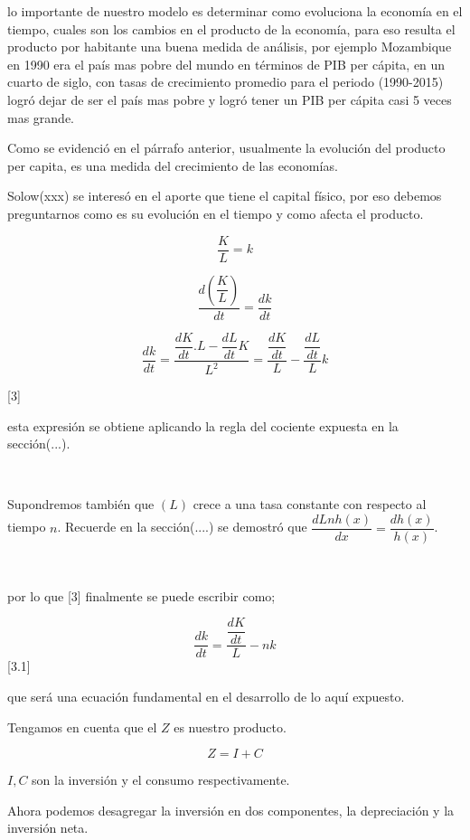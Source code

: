 \documentclass[12pt]{article}
\begin{document}
lo importante de nuestro modelo es determinar como evoluciona la economía en el tiempo, cuales son los cambios en el producto de la economía, para eso resulta el producto por habitante una buena medida de análisis, por ejemplo Mozambique en 1990 era el país mas pobre del mundo en términos de PIB per cápita, en un cuarto de siglo, con tasas de crecimiento promedio para el periodo (1990-2015) logró dejar de ser el país mas pobre y logró tener un PIB per cápita casi 5 veces mas grande.





Como se evidenció en el párrafo anterior, usualmente la evolución del producto per capita, es una medida del crecimiento de las economías.

Solow(xxx) se interesó en el aporte que tiene el capital físico, por eso debemos preguntarnos como es su evolución en el tiempo y como afecta el producto.



$$\dfrac{K}{L} =k $$

$$ \dfrac{d(\dfrac{K}{L})}{dt}= \dfrac {dk}{dt}$$


$$ \dfrac{dk}{dt}=\dfrac{\dfrac{dK}{dt}.L-\dfrac{dL}{dt}K}{L^{2}} = \dfrac{\dfrac{dK}{dt}}{L}-\dfrac{\dfrac{dL}{dt}}{L}k$$

[3]

esta expresión se obtiene aplicando la regla del cociente expuesta en la sección(...).





\

Supondremos también que $(L)$ crece a una tasa constante con respecto al tiempo $n$.  Recuerde en la sección(....) se demostró que $\dfrac{d Ln h(x)}{dx}=\dfrac{dh(x)}{h(x)}$.

\

por lo que [3] finalmente se puede escribir como; 

$$\dfrac{dk}{dt}=\dfrac{\dfrac{dK}{dt}}{L}-nk$$ [3.1] 

que será una ecuación fundamental en el desarrollo de lo aquí expuesto.






Tengamos en cuenta que el $Z$ es nuestro producto.

$$Z=I+C$$

$I,C$ son la inversión y el consumo respectivamente.

Ahora podemos desagregar la inversión en dos componentes, la depreciación y la inversión neta.
\end{document}
